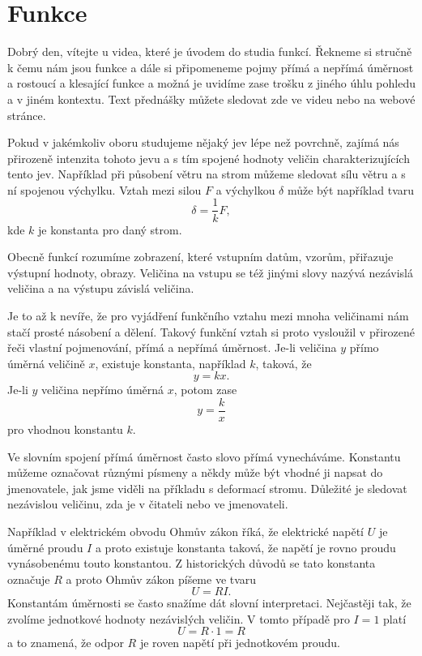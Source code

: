 \documentclass[12pt]{article}
\begin{document}
\section*{Funkce}

Dobrý den, vítejte u videa, které je úvodem do studia funkcí. Řekneme si stručně k čemu nám jsou funkce a dále si připomeneme pojmy přímá a nepřímá úměrnost a rostoucí a klesající funkce a možná je uvidíme zase trošku z jiného úhlu pohledu a v jiném kontextu. Text přednášky můžete sledovat zde ve videu nebo na webové stránce.

Pokud v jakémkoliv oboru studujeme nějaký jev lépe než povrchně, zajímá nás přirozeně intenzita tohoto jevu a s tím spojené hodnoty veličin charakterizujících tento jev. Například při působení větru na strom můžeme sledovat sílu větru a s ní spojenou výchylku. Vztah mezi silou $F$ a výchylkou $\delta$ může být například tvaru $$\delta=\frac 1k F,$$ kde $k$ je konstanta pro daný strom.

Obecně funkcí rozumíme zobrazení, které vstupním datům, vzorům, přiřazuje výstupní hodnoty, obrazy. Veličina na vstupu se též jinými slovy nazývá nezávislá veličina a na výstupu závislá veličina.

Je to až k nevíře, že pro vyjádření funkčního vztahu mezi mnoha veličinami nám stačí prosté násobení a dělení. Takový funkční vztah si proto vysloužil v přirozené řeči vlastní pojmenování, přímá a nepřímá úměrnost. Je-li veličina $y$ přímo úměrná veličině $x$, existuje konstanta, například $k$, taková, že $$y=kx.$$ Je-li $y$ veličina nepřímo úměrná $x$, potom zase $$y=\frac kx$$ pro vhodnou konstantu $k$.

Ve slovním spojení přímá úměrnost často slovo přímá vynecháváme. Konstantu můžeme označovat různými písmeny a někdy může být vhodné ji napsat do jmenovatele, jak jsme viděli na příkladu s deformací stromu. Důležité je sledovat nezávislou veličinu, zda je v čitateli nebo ve jmenovateli.

Například v elektrickém obvodu Ohmův zákon říká, že elektrické napětí $U$ je úměrné proudu $I$ a proto existuje konstanta taková, že napětí je rovno proudu vynásobenému touto konstantou. Z historických důvodů se tato konstanta označuje $R$ a proto Ohmův zákon píšeme ve tvaru $$U=RI.$$ Konstantám úměrnosti se často snažíme dát slovní interpretaci. Nejčastěji tak, že zvolíme jednotkové hodnoty nezávislých veličin. V tomto případě pro $I=1$ platí $$U=R\cdot 1=R$$ a to znamená, že odpor $R$ je roven napětí při jednotkovém proudu.
\end{document}
